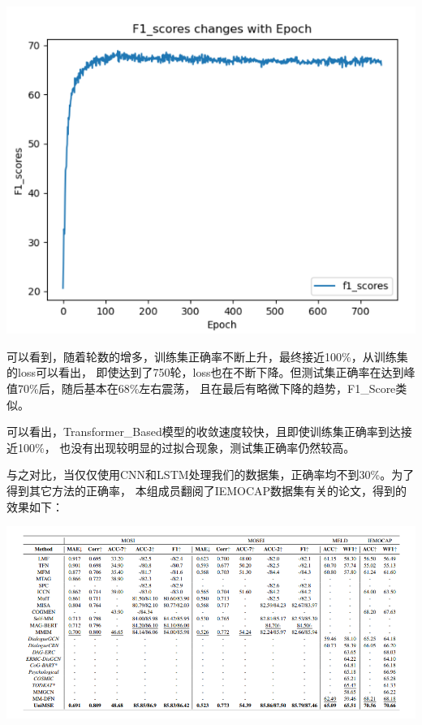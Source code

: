 \documentclass[11pt]{article}
\begin{document}
            \begin{center}
                \includegraphics[scale=1]{graph/result6.png}\\
            \end{center}

            可以看到，随着轮数的增多，训练集正确率不断上升，最终接近100\%，从训练集的loss可以看出，
            即使达到了750轮，loss也在不断下降。但测试集正确率在达到峰值70\%后，随后基本在68\%左右震荡，
            且在最后有略微下降的趋势，F1\_Score类似。
            
            可以看出，Transformer\_Based模型的收敛速度较快，且即使训练集正确率到达接近100\%，
            也没有出现较明显的过拟合现象，测试集正确率仍然较高。
            
            与之对比，当仅仅使用CNN和LSTM处理我们的数据集，正确率均不到30\%。为了得到其它方法的正确率，
            本组成员翻阅了IEMOCAP数据集有关的论文，得到的效果如下：

            \begin{center}
                \includegraphics[scale=0.9]{graph/result7.png}
            \end{center}
\end{document}
